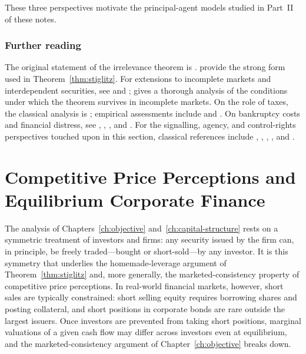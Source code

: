 \documentclass[11pt,a4paper,oneside]{book}
\theoremstyle{plain}
\theoremstyle{definition}
\theoremstyle{remark}
\numberwithin{equation}{chapter}
\begin{document}
These three perspectives motivate the principal-agent models studied in Part~II of these notes.

\subsection{Further reading}

The original statement of the irrelevance theorem is \citet{ModiglianiMiller1958}.
\citet{Stiglitz1969, Stiglitz1974} provide the strong form used in Theorem~\ref{thm:stiglitz}.
For extensions to incomplete markets and interdependent securities, see \citet{DeMarzo1988} and \citet{DeMarzoDuffie1991}; \citet{Gottardi1995} gives a thorough analysis of the conditions under which the theorem survives in incomplete markets.
On the role of taxes, the classical analysis is \citet{Miller1977}; empirical assessments include \citet{MackieMason1990} and \citet{DesaiFoleyHines2004}.
On bankruptcy costs and financial distress, see \citet{SmithWarner1979}, \citet{Weiss1990}, \citet{OplerTitman1994}, and \citet{Purnanandam2008}.
For the signalling, agency, and control-rights perspectives touched upon in this section, classical references include \citet{Ross1977}, \citet{LelandPyle1977}, \citet{JensenMeckling1976}, \citet{AghionBolton1992}, and \citet{HarrisRaviv1989}.

\chapter{Competitive Price Perceptions and Equilibrium Corporate Finance}
\label{ch:price-perceptions}

The analysis of Chapters~\ref{ch:objective} and~\ref{ch:capital-structure} rests on a symmetric treatment of investors and firms: any security issued by the firm can, in principle, be freely traded---bought or short-sold---by any investor.
It is this symmetry that underlies the homemade-leverage argument of Theorem~\ref{thm:stiglitz} and, more generally, the marketed-consistency property of competitive price perceptions.
In real-world financial markets, however, short sales are typically constrained: short selling equity requires borrowing shares and posting collateral, and short positions in corporate bonds are rare outside the largest issuers.
Once investors are prevented from taking short positions, marginal valuations of a given cash flow may differ across investors even at equilibrium, and the marketed-consistency argument of Chapter~\ref{ch:objective} breaks down.
\end{document}
